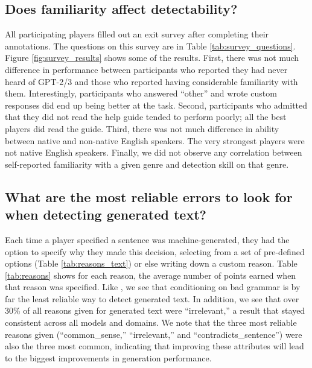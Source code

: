 \subsection{Does familiarity affect detectability?}
All participating players filled out an exit survey after completing their annotations. The questions on this survey are in Table \ref{tab:survey_questions}.
Figure \ref{fig:survey_results} shows some of the results.
First, there was not much difference in performance between participants who reported they had never heard of GPT-2/3 and those who reported having considerable familiarity with them.
Interestingly, participants who answered ``other'' and wrote custom responses did end up being better at the task.
Second, participants who admitted that they did not read the help guide tended to perform poorly; all the best players did read the guide.
Third, there was not much difference in ability between native and non-native English speakers.
The very strongest players were not native English speakers.
Finally, we did not observe any correlation between self-reported familiarity with a given genre and detection skill on that genre.

\subsection{What are the most reliable errors to look for when detecting generated text?}
\label{sec:reasons}
Each time a player specified a sentence was machine-generated, they had the option to specify why they made this decision, selecting from a set of pre-defined options (Table \ref{tab:reasons_text}) or else writing down a custom reason.
Table \ref{tab:reasons} shows for each reason, the average number of points earned when that reason was specified.
Like \citet{clark2021all}, we see that conditioning on bad grammar is by far the least reliable way to detect generated text.
In addition, we see that over 30\% of all reasons given for generated text were ``irrelevant,'' a result that stayed consistent across all models and domains.
We note that the three most reliable reasons given (``common\_sense,'' ``irrelevant,'' and ``contradicts\_sentence'') were also the three most common, indicating that improving these attributes will lead to the biggest improvements in generation performance.


